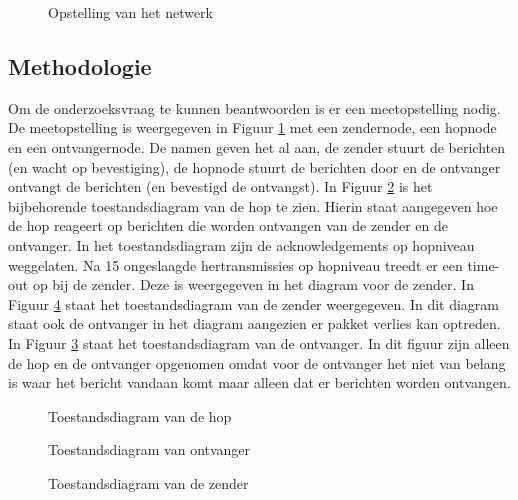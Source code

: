 \documentclass{article}
\begin{document}
\begin{figure}
\centering 
{} 
\caption{Opstelling van het netwerk}
\label{fig:hop} %
\end{figure}

\subsection{Methodologie}
Om de onderzoeksvraag te kunnen beantwoorden is er een meetopstelling nodig. De meetopstelling is weergegeven in Figuur \ref{fig:hop} met een zendernode, een hopnode en een ontvangernode. De namen geven het al aan, de zender stuurt de berichten (en wacht op bevestiging), de hopnode stuurt de berichten door en de ontvanger ontvangt de berichten (en bevestigd de ontvangst). In Figuur \ref{fig:hopstate} is het bijbehorende toestandsdiagram van de hop te zien. Hierin staat aangegeven hoe de hop  reageert op berichten die worden ontvangen van de zender en de ontvanger. In het toestandsdiagram zijn de acknowledgements op hopniveau weggelaten. Na 15 ongeslaagde hertransmissies op hopniveau treedt er een time-out op bij de zender. Deze is weergegeven in het diagram voor de zender. In Figuur \ref{fig:senderstate} staat het toestandsdiagram van de zender weergegeven. In dit diagram staat ook de ontvanger in het diagram aangezien er pakket verlies kan optreden. In Figuur \ref{fig:receiverstate} staat het toestandsdiagram van de ontvanger. In dit figuur zijn alleen de hop en de ontvanger opgenomen omdat voor de ontvanger het niet van belang is waar het bericht vandaan komt maar alleen dat er berichten worden ontvangen. 

\begin{figure}
\centering{} 
\caption{Toestandsdiagram van de hop}
\label{fig:hopstate} %
\end{figure}
\begin{figure}
\centering{} 
\caption{Toestandsdiagram van ontvanger}
\label{fig:receiverstate} %
\end{figure}
\begin{figure}
\centering{} 
\caption{Toestandsdiagram van de zender}
\label{fig:senderstate} %
\end{figure}
\end{document}
